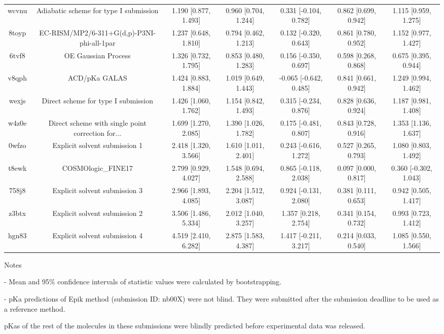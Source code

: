 \documentclass{article}
\begin{document}
\begin{center}
\begin{longtable}{|ccccccc|}
 wcvnu &             Adiabatic scheme for type I submission &  1.190 [0.877, 1.493] &  0.960 [0.704, 1.244] &    0.331 [-0.104, 0.782] &  0.862 [0.699, 0.942] &   1.115 [0.959, 1.275] \\
 8toyp &         EC-RISM/MP2/6-311+G(d,p)-P3NI-phi-all-1par &  1.237 [0.648, 1.810] &  0.794 [0.462, 1.213] &    0.132 [-0.320, 0.643] &  0.861 [0.780, 0.952] &   1.152 [0.977, 1.427] \\
 6tvf8 &                                OE Gaussian Process &  1.326 [0.732, 1.795] &  0.853 [0.480, 1.283] &    0.156 [-0.350, 0.697] &  0.598 [0.268, 0.868] &   0.675 [0.395, 0.944] \\
 v8qph &                                      ACD/pKa GALAS &  1.424 [0.883, 1.884] &  1.019 [0.649, 1.443] &   -0.065 [-0.642, 0.485] &  0.841 [0.661, 0.942] &   1.249 [0.994, 1.462] \\
 wexjs &                Direct scheme for type I submission &  1.426 [1.060, 1.762] &  1.154 [0.842, 1.493] &    0.315 [-0.234, 0.876] &  0.828 [0.636, 0.924] &   1.187 [0.981, 1.408] \\
 w4z0e &  Direct scheme with single point correction for... &  1.699 [1.270, 2.085] &  1.390 [1.026, 1.782] &    0.175 [-0.481, 0.807] &  0.843 [0.728, 0.916] &   1.353 [1.136, 1.637] \\
 0wfzo &                      Explicit solvent submission 1 &  2.418 [1.320, 3.566] &  1.610 [1.011, 2.401] &    0.243 [-0.616, 1.272] &  0.527 [0.265, 0.793] &   1.080 [0.803, 1.492] \\
 t8ewk &                                 COSMOlogic\_FINE17 &  2.799 [0.929, 4.027] &  1.548 [0.694, 2.588] &    0.865 [-0.118, 2.038] &  0.097 [0.000, 0.817] &  0.360 [-0.302, 1.043] \\
 758j8 &                      Explicit solvent submission 3 &  2.966 [1.893, 4.085] &  2.204 [1.512, 3.087] &    0.924 [-0.131, 2.080] &  0.381 [0.111, 0.653] &   0.942 [0.505, 1.417] \\
 z3btx &                      Explicit solvent submission 2 &  3.506 [1.486, 5.334] &  2.012 [1.040, 3.257] &     1.357 [0.218, 2.754] &  0.341 [0.154, 0.732] &   0.993 [0.723, 1.412] \\
 hgn83 &                      Explicit solvent submission 4 &  4.519 [2.410, 6.282] &  2.875 [1.583, 4.387] &    1.417 [-0.211, 3.217] &  0.214 [0.033, 0.540] &   1.085 [0.550, 1.566] \\
\end{longtable}
\end{center}

Notes

- Mean and 95\% confidence intervals of statistic values were calculated by bootstrapping.

- pKa predictions of Epik method (submission ID: nb00X) were not blind. They were submitted after the submission deadline to be used as a reference method.

pKas of the rest of the molecules in these submissions were blindly predicted before experimental data was released.
\end{document}
